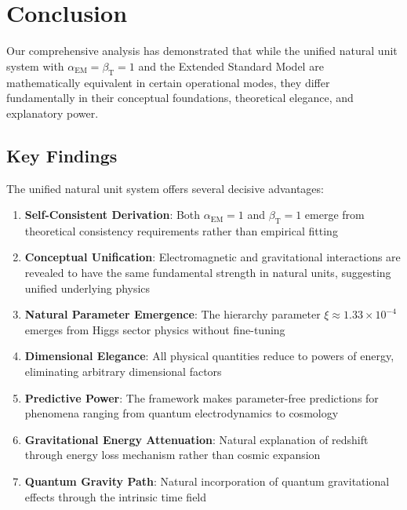 \documentclass[12pt,a4paper]{article}
\newcommand{\alphaEM}{\alpha_{\text{EM}}}
\newcommand{\betaT}{\beta_{\text{T}}}
\newcommand{\xipar}{\xi}
\begin{document}
	\section{Conclusion}
	\label{sec:conclusion}
	
	Our comprehensive analysis has demonstrated that while the unified natural unit system with $\alphaEM = \betaT = 1$ and the Extended Standard Model are mathematically equivalent in certain operational modes, they differ fundamentally in their conceptual foundations, theoretical elegance, and explanatory power.
	
	\subsection{Key Findings}
	\label{subsec:key_findings}
	
	The unified natural unit system offers several decisive advantages:
	
	\begin{enumerate}
		\item \textbf{Self-Consistent Derivation}: Both $\alphaEM = 1$ and $\betaT = 1$ emerge from theoretical consistency requirements rather than empirical fitting \cite{pascher_unified_2025}
		
		\item \textbf{Conceptual Unification}: Electromagnetic and gravitational interactions are revealed to have the same fundamental strength in natural units, suggesting unified underlying physics
		
		\item \textbf{Natural Parameter Emergence}: The hierarchy parameter $\xipar \approx 1.33 \times 10^{-4}$ emerges from Higgs sector physics without fine-tuning \cite{pascher_beta_derivation_2025}
		
		\item \textbf{Dimensional Elegance}: All physical quantities reduce to powers of energy, eliminating arbitrary dimensional factors
		
		\item \textbf{Predictive Power}: The framework makes parameter-free predictions for phenomena ranging from quantum electrodynamics to cosmology \cite{pascher_muon_g2_2025}
		
		\item \textbf{Gravitational Energy Attenuation}: Natural explanation of redshift through energy loss mechanism rather than cosmic expansion
		
		\item \textbf{Quantum Gravity Path}: Natural incorporation of quantum gravitational effects through the intrinsic time field \cite{pascher_lagrangian_2025}
	\end{enumerate}
	
\end{document}
